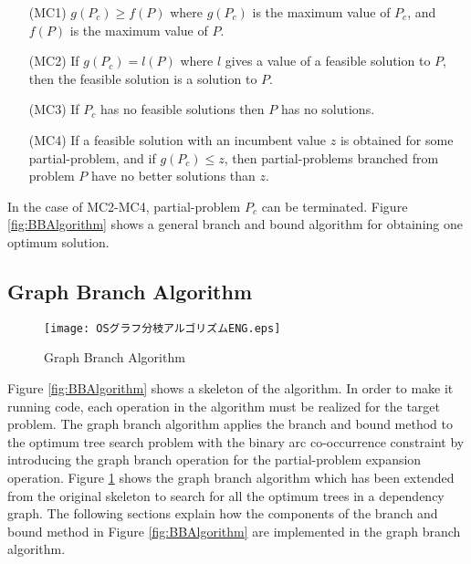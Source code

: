 \begin{itemize}
\item[(MC1)] $g(P_c){\geq}f(P)$ where $g(P_c)$ is the maximum value of $P_c$, and $f(P)$ is the maximum value of $P$.
\item[(MC2)] If $g(P_c)=l(P)$ where $l$ gives a value of a feasible solution to $P$, then the feasible solution is a solution to $P$.
\item[(MC3)] If $P_c$ has no feasible solutions then $P$ has no solutions.
\item[(MC4)] If a feasible solution with an incumbent value $z$ is obtained for some partial-problem, and if $g(P_c){\leq}z$, then partial-problems branched from problem $P$ have no better solutions than $z$.
\end{itemize}

{\mynoindent}In the case of MC2-MC4, partial-problem $P_c$ can be
terminated. Figure \ref{fig:BBAlgorithm} shows a general branch and
bound algorithm for obtaining one optimum solution.


\subsection{Graph Branch Algorithm}
\label{GraphBranchAlgorithm}

\begin{figure}[b]
 \begin{center}
      \texttt{[image: OSグラフ分枝アルゴリズムENG.eps]}
 \end{center}
\myfiglabelskippre
\caption{Graph Branch Algorithm}
\label{fig:GraphBrachAlgorithm}
\end{figure}

Figure \ref{fig:BBAlgorithm} shows a skeleton of the algorithm. In order to make it
running code, each operation in the algorithm must be realized for
the target problem. The graph branch algorithm applies the branch and bound
method to the optimum tree search problem with the binary arc
co-occurrence constraint by introducing the graph branch operation for
the partial-problem expansion operation. Figure \ref{fig:GraphBrachAlgorithm}
shows the graph branch algorithm which has been extended from the original
skeleton to search for all the optimum trees in a dependency graph. The
following sections explain how the components of the branch and bound
method in Figure \ref{fig:BBAlgorithm} are implemented in the graph branch
algorithm.

\mygapskip{}

